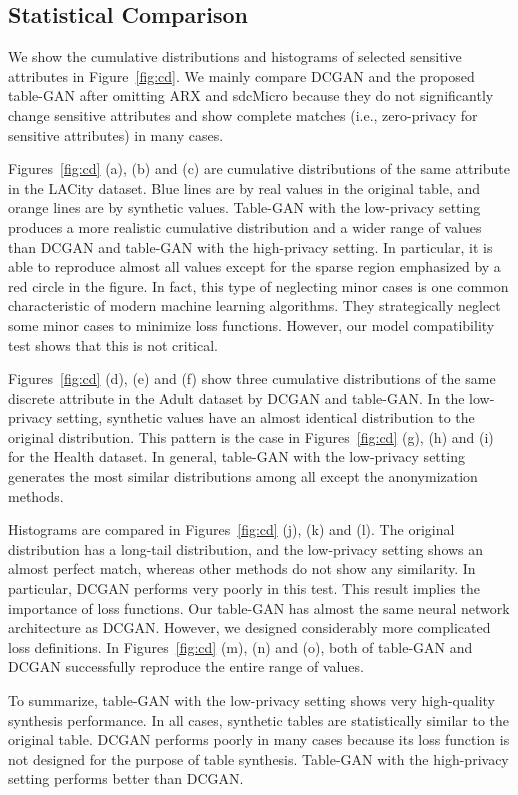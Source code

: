 \subsection{Statistical Comparison}
We show the cumulative distributions and histograms of selected sensitive attributes in Figure~\ref{fig:cd}. We mainly compare DCGAN and the proposed table-GAN after omitting ARX and sdcMicro because they do not significantly change sensitive attributes and show complete matches (i.e., zero-privacy for sensitive attributes) in many cases.

Figures~\ref{fig:cd} (a), (b) and (c) are cumulative distributions of the same attribute in the LACity dataset. Blue lines are by real values in the original table, and orange lines are by synthetic values. Table-GAN with the low-privacy setting produces a more realistic cumulative distribution and a wider range of values than DCGAN and table-GAN with the high-privacy setting. In particular, it is able to reproduce almost all values except for the sparse region emphasized by a red circle in the figure. In fact, this type of neglecting minor cases is one common characteristic of modern machine learning algorithms. They strategically neglect some minor cases to minimize loss functions. However, our model compatibility test shows that this is not critical.

Figures~\ref{fig:cd} (d), (e) and (f) show three cumulative distributions of the same discrete attribute in the Adult dataset by DCGAN and table-GAN. In the low-privacy setting, synthetic values have an almost identical distribution to the original distribution. This pattern is the case in Figures~\ref{fig:cd} (g), (h) and (i) for the Health dataset. In general, table-GAN with the low-privacy setting generates the most similar distributions among all except the anonymization methods.

Histograms are compared in Figures~\ref{fig:cd} (j), (k) and (l). The original distribution has a long-tail distribution, and the low-privacy setting shows an almost perfect match, whereas other methods do not show any similarity. In particular, DCGAN performs very poorly in this test. This result implies the importance of loss functions. Our table-GAN has almost the same neural network architecture as DCGAN. However, we designed considerably more complicated loss definitions. In Figures~\ref{fig:cd} (m), (n) and (o), both of table-GAN and DCGAN successfully reproduce the entire range of values.

To summarize, table-GAN with the low-privacy setting shows very high-quality synthesis performance. In all cases, synthetic tables are statistically similar to the original table. DCGAN performs poorly in many cases because its loss function is not designed for the purpose of table synthesis. Table-GAN with the high-privacy setting performs better than DCGAN.

